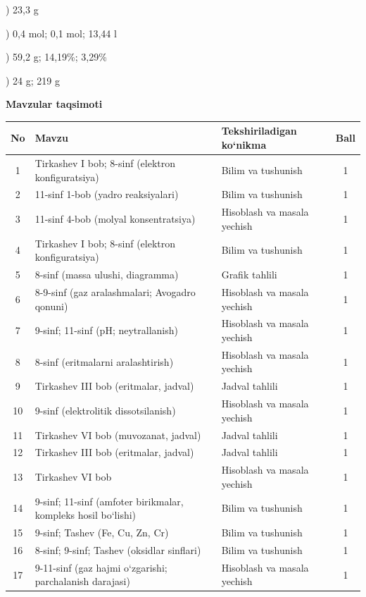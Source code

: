 \documentclass[11pt,a4paper]{article}
\begin{document}
) 23,3 g\par
{}) 0,4 mol; 0,1 mol; 13,44 l\par
{}) 59,2 g; 14,19\%; 3,29\%\par
{}) 24 g; 219 g\par
\par\bigskip\noindent\textbf{Mavzular taqsimoti}\par\smallskip
{\small\noindent\begin{longtable}{|c|p{7.2cm}|p{5.4cm}|c|}\hline \textbf{No} & \textbf{Mavzu} & \textbf{Tekshiriladigan ko`nikma} & \textbf{Ball}\\\hline
1 & Tirkashev I bob; 8-sinf (elektron konfiguratsiya) & Bilim va tushunish & 1\\\hline
2 & 11-sinf 1-bob (yadro reaksiyalari) & Bilim va tushunish & 1\\\hline
3 & 11-sinf 4-bob (molyal konsentratsiya) & Hisoblash va masala yechish & 1\\\hline
4 & Tirkashev I bob; 8-sinf (elektron konfiguratsiya) & Bilim va tushunish & 1\\\hline
5 & 8-sinf (massa ulushi, diagramma) & Grafik tahlili & 1\\\hline
6 & 8-9-sinf (gaz aralashmalari; Avogadro qonuni) & Hisoblash va masala yechish & 1\\\hline
7 & 9-sinf; 11-sinf (pH; neytrallanish) & Hisoblash va masala yechish & 1\\\hline
8 & 8-sinf (eritmalarni aralashtirish) & Hisoblash va masala yechish & 1\\\hline
9 & Tirkashev III bob (eritmalar, jadval) & Jadval tahlili & 1\\\hline
10 & 9-sinf (elektrolitik dissotsilanish) & Hisoblash va masala yechish & 1\\\hline
11 & Tirkashev VI bob (muvozanat, jadval) & Jadval tahlili & 1\\\hline
12 & Tirkashev III bob (eritmalar, jadval) & Jadval tahlili & 1\\\hline
13 & Tirkashev VI bob & Hisoblash va masala yechish & 1\\\hline
14 & 9-sinf; 11-sinf (amfoter birikmalar, kompleks hosil bo`lishi) & Bilim va tushunish & 1\\\hline
15 & 9-sinf; Tashev (Fe, Cu, Zn, Cr) & Bilim va tushunish & 1\\\hline
16 & 8-sinf; 9-sinf; Tashev (oksidlar sinflari) & Bilim va tushunish & 1\\\hline
17 & 9-11-sinf (gaz hajmi o`zgarishi; parchalanish darajasi) & Hisoblash va masala yechish & 1\\\hline

\end{longtable}}
\end{document}

